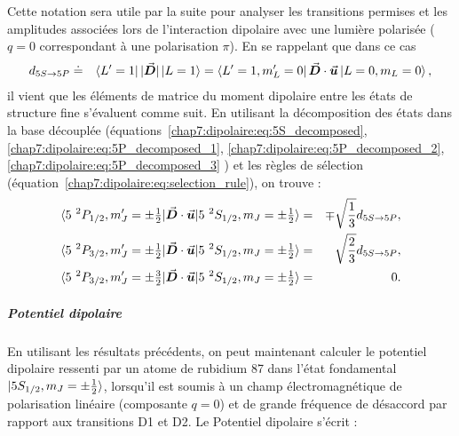 Cette notation sera utile par la suite pour analyser les transitions permises et les amplitudes associées lors de l’interaction dipolaire avec une lumière polarisée ($q = 0$ correspondant à une polarisation $\pi$). En se rappelant que dans ce cas 
\begin{eqnarray}\label{chap7:dipolaire:eq:d5S5P}
	d_{\scriptstyle 5S \rightarrow 5P} & \doteq &\bra{L'=1} \vert \vec{{\bm{D}}} \vert \ket{L=1} = \bra{L'=1 , m_L' =0 }  \vec{{\bm{D}}} \cdot \vec{{\bm{u}}} \ket{L=0 , m_L = 0 },	
\end{eqnarray}
il vient que les éléments de matrice du moment dipolaire entre les états de structure fine s’évaluent comme suit. En utilisant la décomposition des états dans la base découplée (équations~\eqref{chap7:dipolaire:eq:5S_decomposed}, \eqref{chap7:dipolaire:eq:5P_decomposed_1}, \eqref{chap7:dipolaire:eq:5P_decomposed_2}, \eqref{chap7:dipolaire:eq:5P_decomposed_3} ) et les règles de sélection (équation~\eqref{chap7:dipolaire:eq:selection_rule}), on trouve :
\begin{eqnarray}
	\langle 5 {~}^2P_{1/2} , m_J' = \pm\tfrac12 \vert \vec{{\bm{D}}} \cdot \vec{{\bm{u}}}\vert 5 {~}^2S_{1/2} , m_J = \pm  \tfrac12 \rangle	 &=& \mp  \sqrt{\frac{1}{3}} d_{\scriptstyle 5S \rightarrow 5P},\\
	\langle 5 {~}^2P_{3/2} , m_J' = \pm \tfrac12 \vert \vec{{\bm{D}}} \cdot \vec{{\bm{u}}}\vert 5 {~}^2S_{1/2} , m_J = \pm  \tfrac12 \rangle	 &=& \sqrt{\frac{2}{3}} d_{\scriptstyle 5S \rightarrow 5P} , \\
	\langle 5 {~}^2P_{3/2} , m_J' = \pm \tfrac32 \vert \vec{{\bm{D}}} \cdot \vec{{\bm{u}}}\vert 5 {~}^2S_{1/2} , m_J = \pm  \tfrac12 \rangle & = & 0 .
\end{eqnarray}


\subparagraph{Potentiel dipolaire}

En utilisant les résultats précédents, on peut maintenant calculer le potentiel dipolaire ressenti par un atome de rubidium 87 dans l’état fondamental $\ket{5S_{1/2}, m_J = \pm \tfrac12}$, lorsqu’il est soumis à un champ électromagnétique de polarisation linéaire (composante $q = 0$) et de grande fréquence de désaccord par rapport aux transitions D1 et D2.
Le Potentiel dipolaire s'écrit :

